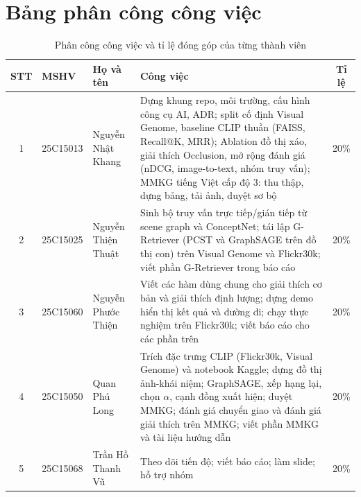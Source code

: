 \appendices

\section{Bảng phân công công việc}
\label{app:tasks}
\begin{table}[h]
\centering
\caption{Phân công công việc và tỉ lệ đóng góp của từng thành viên}
\label{tab:tasks}
\scriptsize
\setlength{\tabcolsep}{2pt}
\renewcommand{\arraystretch}{1.15}
\begin{tabular}{@{}c >{\raggedright\arraybackslash}p{1.05cm} >{\raggedright\arraybackslash}p{2.0cm} >{\raggedright\arraybackslash}p{3.45cm} c@{}}
\toprule
\textbf{STT} & \textbf{MSHV} & \textbf{Họ và tên} & \textbf{Công việc} & \textbf{Tỉ lệ} \\
\midrule
1 & 25C15013 & Nguyễn Nhật Khang & Dựng khung repo, môi trường, cấu hình công cụ AI, ADR; split cố định Visual Genome, baseline CLIP thuần (FAISS, Recall@K, MRR); Ablation đồ thị xáo, giải thích Occlusion, mở rộng đánh giá (nDCG, image-to-text, nhóm truy vấn); MMKG tiếng Việt cấp độ 3: thu thập, dựng bảng, tải ảnh, duyệt sơ bộ & 20\% \\
2 & 25C15025 & Nguyễn Thiện Thuật & Sinh bộ truy vấn trực tiếp/gián tiếp từ scene graph và ConceptNet; tái lập G-Retriever (PCST và GraphSAGE trên đồ thị con) trên Visual Genome và Flickr30k; viết phần G-Retriever trong báo cáo & 20\% \\
3 & 25C15060 & Nguyễn Phước Thiện & Viết các hàm dùng chung cho giải thích cơ bản và giải thích định lượng; dựng demo hiển thị kết quả và đường đi; chạy thực nghiệm trên Flickr30k; viết báo cáo cho các phần trên & 20\% \\
4 & 25C15050 & Quan Phú Long & Trích đặc trưng CLIP (Flickr30k, Visual Genome) và notebook Kaggle; dựng đồ thị ảnh-khái niệm; GraphSAGE, xếp hạng lại, chọn $\alpha$, cạnh đồng xuất hiện; duyệt MMKG; đánh giá chuyển giao và đánh giá giải thích trên MMKG; viết phần MMKG và tài liệu hướng dẫn & 20\% \\
5 & 25C15068 & Trần Hồ Thanh Vũ & Theo dõi tiến độ; viết báo cáo; làm slide; hỗ trợ nhóm & 20\% \\
\bottomrule
\end{tabular}
\end{table}
